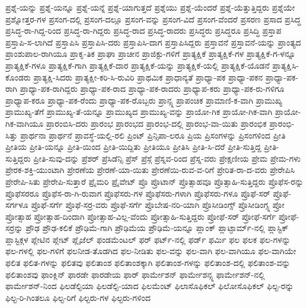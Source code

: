{ಪ್ರಶ್ನೆ-ಯನ್ನು
ಪ್ರಶ್ನೆ-ಯನ್ನೂ
ಪ್ರಶ್ನೆ-ಯನ್ನೆ
ಪ್ರಶ್ನೆ-ಯಾಗುತ್ತದೆ
ಪ್ರಶ್ನೆಯು
ಪ್ರಶ್ನೆ-ಯೆಂದರೆ
ಪ್ರಶ್ನೆ-ಯೆತ್ತುತ್ತಿದ್ದರು
ಪ್ರಶ್ನೆಯೇ
ಪ್ರಶ್ನೋತ್ತರ-ಗಳ
ಪ್ರಸಂಗ-ದಲ್ಲಿ
ಪ್ರಸಂಗ-ದಲ್ಲೂ
ಪ್ರಸಂಗ-ವನ್ನು
ಪ್ರಸಂಗ-ವಿದೆ
ಪ್ರಸಂಗ-ವೆಂದರೆ
ಪ್ರಸರಣ
ಪ್ರಸಾದ
ಪ್ರಸಿದ್ಧ
ಪ್ರಸಿದ್ಧ-ರಾ-ಗಿದ್ದ-ರಿಂದ
ಪ್ರಸಿದ್ಧ-ರಾ-ಗಿದ್ದರು
ಪ್ರಸಿದ್ಧ-ರಾದ
ಪ್ರಸಿದ್ಧ-ರಾದರು
ಪ್ರಸಿದ್ಧರು
ಪ್ರಸಿದ್ಧರೂ
ಪ್ರಸಿದ್ಧಿ
ಪ್ರಸ್ತಾಪ
ಪ್ರಸ್ತಾಪಿ-ಸ-ಲಾಗಿದೆ
ಪ್ರಸ್ತಾಪಿಸಿ
ಪ್ರಸ್ತಾಪಿಸಿ-ದರು
ಪ್ರಸ್ತಾಪಿಸಿ-ದಾಗ
ಪ್ರಸ್ತಾಪಿಸಿದ್ದರು
ಪ್ರಸ್ತಾವನೆ
ಪ್ರಸ್ತಾವನೆ-ಯನ್ನು
ಪ್ರಾಂತ್ಯದ
ಪ್ರಾಂಶುಪಾಲ-ರಾಗಿಯೂ
ಪ್ರಾಕೃ-ತಿಕ
ಪ್ರಾಘಾ
ಪ್ರಾಚೀನ
ಪ್ರಾಜಿಕ್ಟು-ಗಳಿಗೆ
ಪ್ರಾತ್ಯಕ್ಷಿಕೆ
ಪ್ರಾತ್ಯಕ್ಷಿಕೆ-ಗಳ
ಪ್ರಾತ್ಯಕ್ಷಿಕೆ-ಗ-ಳನ್ನೂ
ಪ್ರಾತ್ಯಕ್ಷಿಕೆ-ಗಳೂ
ಪ್ರಾತ್ಯಕ್ಷಿಕೆ-ಗಾಗಿ
ಪ್ರಾತ್ಯಕ್ಷಿಕೆ-ದಾರ
ಪ್ರಾತ್ಯಕ್ಷಿಕೆ-ಯನ್ನು
ಪ್ರಾತ್ಯಕ್ಷಿಕೆ-ಯಲ್ಲಿ
ಪ್ರಾತ್ಯಕ್ಷಿಕೆ-ಯೊಡನೆ
ಪ್ರಾತ್ಯಕ್ಷಿಸಿ-ಕೊಂಡರು
ಪ್ರಾತ್ಯಕ್ಷಿ-ಸಿದರು
ಪ್ರಾತ್ಯಕ್ಷೀ-ಕರಿ-ಸಿ-ರುವಿರಿ
ಪ್ರಾಥಮಿಕ
ಪ್ರಾಧಾನ್ಯತೆ
ಪ್ರಾಧ್ಯಾ-ಪಕ
ಪ್ರಾಧ್ಯಾ-ಪಕನ
ಪ್ರಾಧ್ಯಾ-ಪಕ-ರಾಗಿ
ಪ್ರಾಧ್ಯಾ-ಪಕ-ರಾಗಿದ್ದರು
ಪ್ರಾಧ್ಯಾ-ಪಕ-ರಾದ
ಪ್ರಾಧ್ಯಾ-ಪಕ-ರಾದರು
ಪ್ರಾಧ್ಯಾಪ-ಕರು
ಪ್ರಾಧ್ಯಾ-ಪಕ-ರು-ಗಳಿಗೂ
ಪ್ರಾಧ್ಯಾಪ-ಕರೂ
ಪ್ರಾಧ್ಯಾ-ಪಕ-ರೆಂದು
ಪ್ರಾಧ್ಯಾ-ಪಕ-ರೊಬ್ಬರು
ಪ್ರಾನ್ಸ್ನ
ಪ್ರಾಪಂಚಿಕ
ಪ್ರಾಮಾಣಿ-ಕ-ವಾಗಿ
ಪ್ರಾಮುಖ್ಯ
ಪ್ರಾಮುಖ್ಯ-ತೆಗೆ
ಪ್ರಾಮುಖ್ಯ-ತೆ-ಯನ್ನೂ
ಪ್ರಾಮುಖ್ಯದ
ಪ್ರಾಮುಖ್ಯ-ವನ್ನು
ಪ್ರಾಯೋ-ಗಿಕ
ಪ್ರಾಯೋ-ಗಿಕ-ವಾಗಿ
ಪ್ರಾಯೋ-ಗಿಕ-ವಾಗಿಯೂ
ಪ್ರಾರಂಬಿಸಿ-ದರು
ಪ್ರಾರಂಭ
ಪ್ರಾರಂಭದ
ಪ್ರಾರಂಭ-ದಲ್ಲಿ
ಪ್ರಾರಂಭ-ವಾ-ಯಿತು
ಪ್ರಾರಂಭಿಕ
ಪ್ರಾರಂಭಿ-ಸಿತ್ತು
ಪ್ರಾರ್ಥನಾ
ಪ್ರಾರ್ಥನೆ
ಪ್ರಾವಸ್ಥೆ-ಯಲ್ಲಿ-ರಲಿ
ಪ್ರಿಂಟ್
ಪ್ರಿನ್ಸಿಪಾ-ಲರೂ
ಪ್ರಿಯ
ಪ್ರಿಸಂಗಳನ್ನು
ಪ್ರಿಸಂಗಳಿಂದ
ಪ್ರೀತಿ
ಪ್ರೀತಿಯ
ಪ್ರೀತಿ-ಯನ್ನೂ
ಪ್ರೀತಿ-ಯಿಂದ
ಪ್ರೀತಿ-ಯಿದ್ದಿತು
ಪ್ರೀತಿಯೂ
ಪ್ರೀತಿಸಿ
ಪ್ರೀತಿ-ಸಿ-ದರೆ
ಪ್ರೀತಿ-ಸುತ್ತಿದ್ದ
ಪ್ರೀತಿ-ಸುತ್ತಿದ್ದರು
ಪ್ರೀತಿ-ಸುವು-ದನ್ನು
ಪ್ರೆಶರ್
ಪ್ರೆಸಿಡೆನ್ಸಿ
ಪ್ರೆಸ್
ಪ್ರೆಸ್ಗೆ
ಪ್ರೆಸ್ನವ-ರಿಂದ
ಪ್ರೆಸ್ನ-ವರು
ಪ್ರೇಕ್ಷಣೀಯ
ಪ್ರೇಮ
ಪ್ರೇಮ-ಗಳು
ಪ್ರೇರಕ-ಶಕ್ತಿ-ಯುಂಟಾಗಿ
ಪ್ರೇರಣೆಯ
ಪ್ರೇರಣೆ-ಯಾ-ಯಿತು
ಪ್ರೇರಣೆಯಿ-ರುವ-ವ-ರಿಗೆ
ಪ್ರೇರಿತ-ರಾ-ದ-ವರು
ಪ್ರೇರೇಪಿಸಿ
ಪ್ರೇರೇಪಿ-ಸಿತು
ಪ್ರೇರೇಪಿ-ಸುತ್ತಾರೆ
ಪ್ರೈಮರಿ
ಪ್ರೈವೇಟ್
ಪ್ರೊ
ಪ್ರೊಟಾನ್
ಪ್ರೊತ್ಸಾಹವೂ
ಪ್ರೊತ್ಸಾಹಿ-ಸುತ್ತಿದ್ದರು
ಪ್ರೊಫೆಸ-ರನ್ನು
ಪ್ರೊಫೆಸರರೂ
ಪ್ರೊಫೆಸ-ರಾ-ಗಿ-ರುವಾಗ
ಪ್ರೊಫೆಸರು-ಗಳ
ಪ್ರೊಫೆಸರು-ಗಳಾಗಿ
ಪ್ರೊಫೆಸರು-ಗಳೂ
ಪ್ರೊಫೆ-ಸರ್
ಪ್ರೊಫೆ-ಸರ್ಗಳೂ
ಪ್ರೊಫೆ-ಸರ್ಗೆ
ಪ್ರೊಫೆ-ಸರ್ರ-ವರು
ಪ್ರೊಫೆ-ಸರ್ಗೆ
ಪ್ರೊಬೇಷ-ನರಿ-ಯಾಗಿ
ಪ್ರೊಸೀಡಿಂಗ್ಸ್
ಪ್ರೊಸೀಡಿಂಗ್ಸ್ನ
ಪ್ರೋ
ಪ್ರೋತ್ಸಾಹ
ಪ್ರೋತ್ಸಾಹ-ದಿಂದಾಗಿ
ಪ್ರೋತ್ಸಾಹ-ವಿಲ್ಲ-ವೆಂದು
ಪ್ರೋತ್ಸಾಹಿ-ಸುತ್ತಿದ್ದರು
ಪ್ರೋಫೆ-ಸರ್
ಪ್ರೋಫೆ-ಸರ್ಗೆ
ಪ್ರೋಫೆ-ಸರ್ರನ್ನು
ಪ್ರೌಢ
ಪ್ರೌಢ-ಕಲಿಕೆ
ಪ್ರೌಢಿಮೆ-ಗಾಗಿ
ಪ್ರೌಢಿಮೆಯ
ಪ್ರೌಢಿಮೆ-ಯನ್ನೂ
ಪ್ಲಾಂಕ್
ಪ್ಲಾಟ್ಫಾರ್ಮ್-ನಲ್ಲಿ
ಪ್ಲಾಸ್ಟಿಕ್
ಪ್ಲಾಸ್ಟಿಕ್ಗಳ
ಪ್ಲೇಟಿನ
ಪ್ಲೇಟ್
ಪ್ಲೈಜೆಲ್
ಫಂಡಮೆಂಟಲ್
ಫರ್
ಫರ್ಟ್-ನಲ್ಲಿ
ಫರ್ಡ್
ಫರ್ಮಿ
ಫಲ
ಫಲಕ
ಫಲ-ಗಳನ್ನು
ಫಲ-ಗಳಲ್ಲಿ
ಫಲ-ಗಳಿಗೆ
ಫಲನೀಡ-ತೊಡಗಿದ
ಫಲ-ನೀಡಿತು
ಫಲ-ವನ್ನು
ಫಲ-ವಾಗಿ
ಫಲ-ವಾಗಿಯೂ
ಫಲ-ವಾಗಿಯೇ
ಫಲಿತ
ಫಲಿತ-ಗಳನ್ನು
ಫಲಿತವು
ಫಲಿತಾಂಶ
ಫಲಿತಾಂಶಕ್ಕಾಗಿ
ಫಲಿತಾಂಶ-ಗಳನ್ನು
ಫಲಿತಾಂಶ-ದಲ್ಲಿ
ಫಲಿತಾಂಶ-ವನ್ನು
ಫಲಿತಾಂಶವು
ಫಾಂಕ್ಲಿನ್
ಫಾರಡೇ
ಫಾರಡೇಯ
ಫಾರ್
ಫಾರ್ಮೇಶನ್
ಫಾರ್ಮೇಶನ್ಸ್ನ
ಫಾರ್ಮೇಶನ್-ನಲ್ಲಿ
ಫಾರ್ಮೇಶನ್-ನಿಂದ
ಫಿಲಡೆಲ್ಫಿಯಾ
ಫಿಲಡೆಲ್ಫಿ-ಯಾದ
ಫಿಲಮೆಂಟ್
ಫಿಲಾಸೊಫಿಕಲ್
ಫಿಲೋಸೊಫಿಕಲ್
ಫಿಲ್ಟ-ರನ್ನು
ಫಿಲ್ಟ-ರಿ-ಗಿಂತಲೂ
ಫಿಲ್ಟ-ರಿಗೆ
ಫಿಲ್ಟರು-ಗಳ
ಫಿಲ್ಟರು-ಗಳಿಂದ
}
